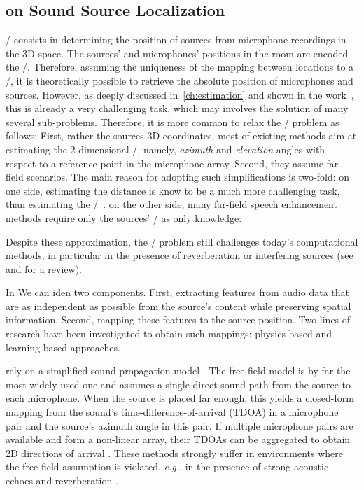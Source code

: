\subsection{on Sound Source Localization}
\SSLdef/ consists in determining the position of sources from microphone recordings in the 3D space.
The sources' and microphones' positions in the room are encoded the \RIRs/.
Therefore, assuming the uniqueness of the mapping between locations to a \RIR/, it is theoretically possible to retrieve the absolute position of microphones and sources.
However, as deeply discussed in~\cref{ch:estimation} and shown in the work~, this is already a very challenging task, which may involves the solution of many several sub-problems.
Therefore, it is more common to relax the \SSL/ problem as follows:
First, rather the sources 3D coordinates, most of existing methods aim at estimating the 2-dimensional \DOAdef/, namely, \textit{azimuth} and \textit{elevation} angles with respect to a reference point in the microphone array.
Second, they assume far-field scenarios.
The main reason for adopting such simplifications is two-fold:
on one side, estimating the distance is know to be a much more challenging task, than estimating the \DOAs/~.
on the other side, many far-field speech enhancement methods require only the sources' \DOAs/ as only knowledge.

\mynewline
Despite these approximation, the \SSL/ problem still challenges today's computational methods, in particular in the presence of reverberation or interfering sources (see \cite{rascon2017localization} and \cite{Argentieri2015} for a review).


In We can iden two components.
First, extracting features from audio data that are as independent as possible from the source's content while preserving spatial information.
Second, mapping these features to the source position.
Two lines of research have been investigated to obtain such mappings: physics-based and learning-based approaches.

 rely on a simplified sound propagation model \cite{rascon2017localization,Knapp1976,DiBiase2001,Lebarbenchon2018}.
The free-field model is by far the most widely used one and assumes
a single direct sound path from the source to each microphone.
When the source is placed far enough, this yields a closed-form mapping from the
sound's time-difference-of-arrival (TDOA) in a microphone pair and the source's azimuth angle in this pair.
If multiple microphone pairs are available and form a non-linear array,
their TDOAs can be aggregated to obtain 2D directions of arrival \cite{DiBiase2001}.
These methods strongly suffer in environments where the free-field assumption is violated,
\textit{e.g.}, in the presence of strong acoustic echoes and reverberation \cite{Scheuing2006}.

